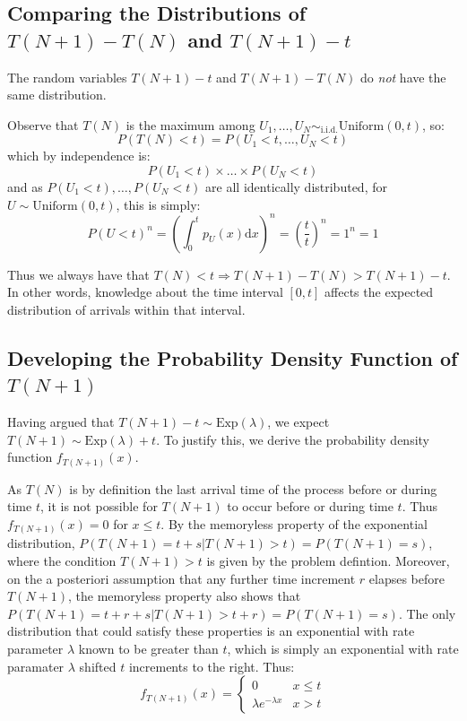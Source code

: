 \documentclass[11pt, oneside]{article}   	%
\begin{document}
\subsection{Comparing the Distributions of $T(N+1)-T(N)$ and $T(N+1)-t$}
The random variables $T(N + 1) - t$ and $T(N + 1) - T(N)$ do \emph{not} have the same distribution.

Observe that $T(N)$ is the maximum among $U_1, \dots, U_N \sim_{\text{i.i.d.}} \text{Uniform}(0, t)$, so:
$$P(T(N) < t) = P(U_1 < t, \dots, U_N < t)$$
which by independence is:
$$P(U_1 < t) \times \dots \times P(U_N < t)$$
and as $P(U_1 < t), \dots,  P(U_N < t)$ are all identically distributed, for $U \sim \text{Uniform}(0, t)$, this is simply:
$$P(U < t)^n = \left( \int_{0}^{t} p_U(x) \mathrm{d}x \right)^n = \left(\frac{t}{t}\right)^n = 1^n = 1$$

Thus we always have that $T(N) < t \Rightarrow T(N + 1) - T(N) > T(N + 1) - t$. In other words, knowledge about the time interval $[0,t]$ affects the expected distribution of arrivals within that interval.
\subsection{Developing the Probability Density Function of $T(N+1)$}
Having argued that $T(N + 1) - t \sim \text{Exp}(\lambda)$, we expect $T(N + 1) \sim \text{Exp}(\lambda) + t$. To justify this, we derive the probability density function $f_{T(N + 1)}(x)$.

As $T(N)$ is by definition the last arrival time of the process before or during time $t$, it is not possible for $T(N + 1)$ to occur before or during time $t$. Thus $f_{T(N + 1)}(x) = 0$ for $x \leq t$. By the memoryless property of the exponential distribution, $P(T(N + 1) = t + s | T(N + 1) > t) = P(T(N + 1) = s)$, where the condition $T(N + 1) > t$ is given by the problem defintion. Moreover, on the a posteriori assumption that any further time increment $r$ elapses before $T(N + 1)$, the memoryless property also shows that $P(T(N + 1) = t + r + s | T(N + 1) > t + r) = P(T(N + 1) = s)$. The only distribution that could satisfy these properties is an exponential with rate parameter $\lambda$ known to be greater than $t$, which is simply an exponential with rate paramater $\lambda$ shifted $t$ increments to the right. Thus:
\[
f_{T(N + 1)}(x) =
\begin{cases} 
      0 & x \leq t \\
      \lambda e^{-\lambda x} & x > t 
   \end{cases}
\]
\end{document}
